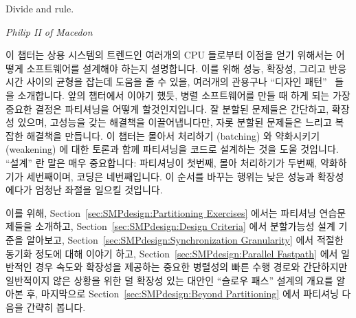 

\epigraph{Divide and rule.}{\emph{Philip II of Macedon}}

이 챕터는 상용 시스템의 트렌드인 여러개의 CPU 들로부터 이점을 얻기 위해서는
어떻게 소프트웨어를 설계해야 하는지 설명합니다.
이를 위해 성능, 확장성, 그리고 반응시간 사이의 균형을 잡는데 도움을 줄 수 있을,
여러개의 관용구나 ``디자인
패턴''~\cite{Alexander79,GOF95,SchmidtStalRohnertBuschmann2000v2Textbook} 들을
소개합니다.
앞의 챕터에서 이야기 했듯, 병렬 소프트웨어를 만들 때 하게 되는 가장 중요한
결정은 파티셔닝을 어떻게 할것인지입니다.
잘 분할된 문제들은 간단하고, 확장성 있으며, 고성능을 갖는 해결책을
이끌어냅니다만, 자롯 분할된 문제들은 느리고 복잡한 해결책을 만듭니다.
이 챕터는 몰아서 처리하기 (batching) 와 약화시키기 (weakening) 에 대한 토론과
함께 파티셔닝을 코드로 설계하는 것을 도울 것입니다.
``설계'' 란 말은 매우 중요합니다: 파티셔닝이 첫번째, 몰아 처리하기가 두번째,
약화하기가 세번째이며, 코딩은 네번째입니다.
이 순서를 바꾸는 행위는 낮은 성능과 확장성에다가 엄청난 좌절을 일으킬 것입니다.

이를 위해, Section~\ref{sec:SMPdesign:Partitioning Exercises} 에서는 파티셔닝
연습문제들을 소개하고,
Section~\ref{sec:SMPdesign:Design Criteria} 에서 분할가능성 설계 기준을
알아보고,
Section~\ref{sec:SMPdesign:Synchronization Granularity} 에서 적절한 동기화
정도에 대해 이야기 하고,
Section~\ref{sec:SMPdesign:Parallel Fastpath} 에서 일반적인 경우 속도와
확장성을 제공하는 중요한 병렬성의 빠른 수행 경로와 간단하지만 일반적이지 않은
상황을 위한 덜 확장성 있는 대안인 ``슬로우 패스'' 설계의 개요를 알아본 후,
마지막으로
Section~\ref{sec:SMPdesign:Beyond Partitioning} 에서 파티셔닝 다음을 간략히
봅니다.
\iffalse

